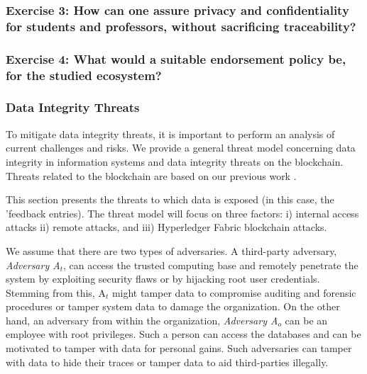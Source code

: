 \documentclass[12pt,a4paper]{article}
\theoremstyle{definition}
\begin{document}
\subsubsection*{Exercise 3: How can one assure privacy and confidentiality for students and professors, without sacrificing traceability?}


\subsubsection*{Exercise 4: What would a suitable endorsement policy be, for the studied ecosystem?}



\subsubsection{Data Integrity Threats}
\label{sec: threat_model}
To mitigate data integrity threats, it is important to perform an analysis of current challenges and risks.
We provide a general threat model concerning data integrity in information systems and data integrity threats on the blockchain. Threats related to the blockchain are based on our previous work \cite{belchior2019_audits}.


This section presents the threats to which data is exposed (in this case, the 'feedback entries). The threat model will focus on three factors: i) internal access attacks ii) remote attacks, and iii) Hyperledger Fabric blockchain attacks.

We assume that there are two types of adversaries. A third-party adversary, \emph{Adversary A$_{t}$}, can access the trusted computing base and remotely penetrate the system by exploiting security flaws or by hijacking root user credentials. Stemming from this, A$_{t}$ might tamper data to compromise auditing and forensic procedures or tamper system data to damage the organization. On the other hand, an adversary from within the organization, \emph{Adversary A$_{o}$} can be an employee with root privileges. Such a person can access the databases and can be motivated to tamper with data for personal gains. Such adversaries can tamper with data to hide their traces or tamper data to aid third-parties illegally.
\end{document}
